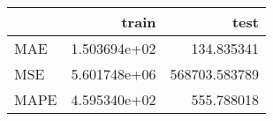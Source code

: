 \begin{tabular}{lrr}
\toprule
{} &         train &           test \\
\midrule
MAE  &  1.503694e+02 &     134.835341 \\
MSE  &  5.601748e+06 &  568703.583789 \\
MAPE &  4.595340e+02 &     555.788018 \\
\bottomrule
\end{tabular}
